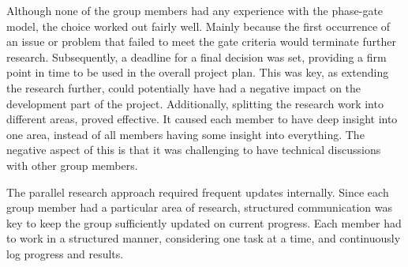 Although none of the group members had any experience with the phase-gate model, the choice worked out fairly well. Mainly because the first occurrence of an issue or problem that failed to meet the gate criteria would terminate further research. Subsequently, a deadline for a final decision was set, providing a firm point in time to be used in the overall project plan. This was key, as extending the research further, could potentially have had a negative impact on the development part of the project. Additionally, splitting the research work into different areas, proved effective. It caused each member to have deep insight into one area, instead of all members having some insight into everything. The negative aspect of this is that it was challenging to have technical discussions with other group members.

The parallel research approach required frequent updates internally. Since each group member had a particular area of research, structured communication was key to keep the group sufficiently updated on current progress. Each member had to work in a structured manner, considering one task at a time, and continuously log progress and results.



